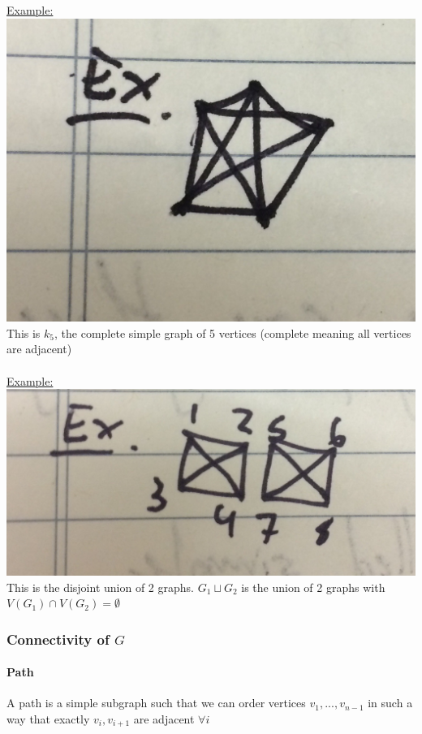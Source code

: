 \documentclass[12pt]{article}
\begin{document}
\underline{Example:}\\
\includegraphics[scale=0.3]{lec3-3}\\
This is $k_5$, the complete simple graph of 5 vertices (complete meaning all vertices are adjacent)\\
\\
\underline{Example:}\\
\includegraphics[scale=0.22]{lec3-4}\\
This is the disjoint union of 2 graphs. $G_1 \sqcup G_2$ is the union of 2 graphs with $V(G_1) \cap V(G_2) = \emptyset$

\subsubsection{Connectivity of $G$}

\paragraph{Path} A path is a simple subgraph such that we can order vertices $v_1, ... ,v_{n-1}$ in such a way that exactly $v_i, v_{i+1}$ are adjacent $\forall i$
\end{document}
